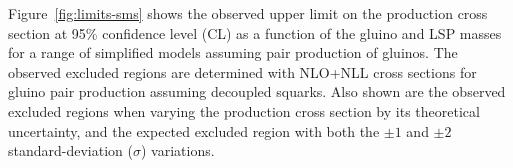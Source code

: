 


Figure~\ref{fig:limits-sms} shows the observed upper limit on the
production cross section at 95\% confidence level (CL) as a function
of the gluino and LSP masses for
a range of simplified models assuming pair production of gluinos. 
%
%
%
The observed excluded regions are determined with NLO+NLL
cross sections for gluino pair production assuming decoupled squarks. Also shown are the
observed excluded regions when varying the production cross section by
its theoretical uncertainty, and the expected excluded region with
both the ${\pm}1$ and ${\pm}2$ standard-deviation ($\sigma$)
variations. 

